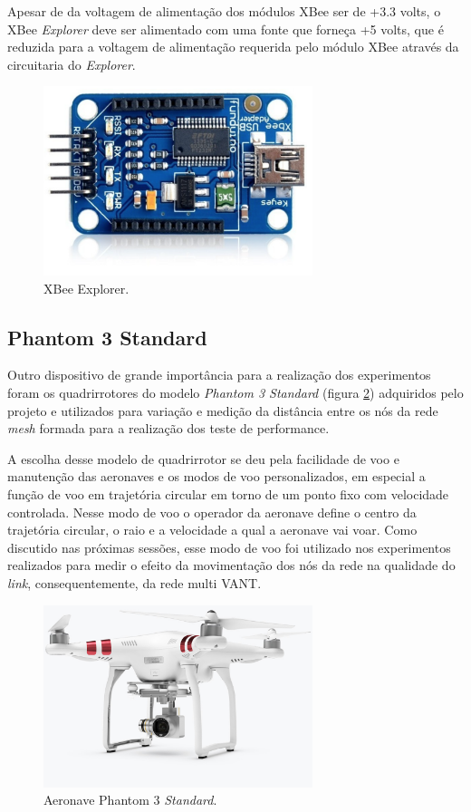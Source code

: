 Apesar de da voltagem de alimentação dos módulos XBee ser de +3.3 volts, o XBee \emph{Explorer} deve ser alimentado com uma fonte que forneça +5 volts, que é reduzida para a voltagem de alimentação requerida pelo módulo XBee através da circuitaria do \emph{Explorer}.

\begin{figure}[h!] 
\center
\includegraphics[width=0.7\textwidth]{xbeeexplorer.png}
\caption{XBee Explorer.} 
\label{fig:xbeeexplorer}
\end{figure} 

\subsection{Phantom 3 Standard}

Outro dispositivo de grande importância para a realização dos experimentos foram os quadrirrotores do modelo \emph{Phantom 3 Standard} (figura \ref{fig:phantom}) adquiridos pelo projeto e utilizados para variação e medição da distância entre os nós da rede \emph{mesh} formada para a realização dos teste de performance.

A escolha desse modelo de quadrirrotor se deu pela facilidade de voo e manutenção das aeronaves e os modos de voo personalizados, em especial a função de voo em trajetória circular em torno de um ponto fixo com velocidade controlada. Nesse modo de voo o operador da aeronave define o centro da trajetória circular, o raio e a velocidade a qual a aeronave vai voar. Como discutido nas próximas sessões, esse modo de voo foi utilizado nos experimentos realizados para medir o efeito da movimentação dos nós da rede na qualidade do \emph{link}, consequentemente, da rede multi VANT.

\begin{figure}[h!] 
\center
\includegraphics[width=0.7\textwidth]{phatom.jpg}
\caption{Aeronave Phantom 3 \emph{Standard}.} 
\label{fig:phantom}
\end{figure}


